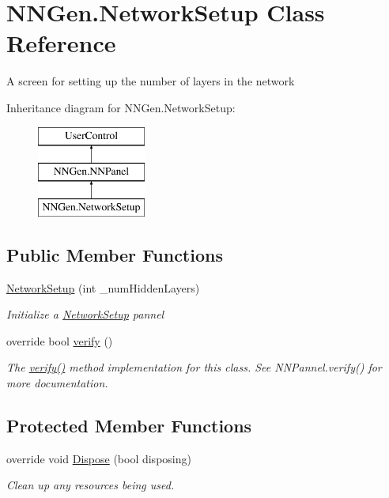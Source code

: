 \hypertarget{class_n_n_gen_1_1_network_setup}{}\section{N\+N\+Gen.\+Network\+Setup Class Reference}
\label{class_n_n_gen_1_1_network_setup}


A screen for setting up the number of layers in the network  


Inheritance diagram for N\+N\+Gen.\+Network\+Setup\+:\begin{figure}[H]
\begin{center}
\leavevmode
\includegraphics[height=3.000000cm]{class_n_n_gen_1_1_network_setup}
\end{center}
\end{figure}
\subsection*{Public Member Functions}
\begin{DoxyCompactItemize}
\item 
\hyperlink{class_n_n_gen_1_1_network_setup_ae51ae2c3bb47dab47afd6d022e07a230}{Network\+Setup} (int \+\_\+num\+Hidden\+Layers)
\begin{DoxyCompactList}\small\item\em Initialize a \hyperlink{class_n_n_gen_1_1_network_setup}{Network\+Setup} pannel \end{DoxyCompactList}\item 
override bool \hyperlink{class_n_n_gen_1_1_network_setup_a0fadf5361f2bea6d04cbfe70012c3365}{verify} ()
\begin{DoxyCompactList}\small\item\em The \hyperlink{class_n_n_gen_1_1_network_setup_a0fadf5361f2bea6d04cbfe70012c3365}{verify()} method implementation for this class. See N\+N\+Pannel.\+verify() for more documentation. \end{DoxyCompactList}\end{DoxyCompactItemize}
\subsection*{Protected Member Functions}
\begin{DoxyCompactItemize}
\item 
override void \hyperlink{class_n_n_gen_1_1_network_setup_a53c3ce61507af95b37e90045529eb086}{Dispose} (bool disposing)
\begin{DoxyCompactList}\small\item\em Clean up any resources being used. \end{DoxyCompactList}\end{DoxyCompactItemize}
